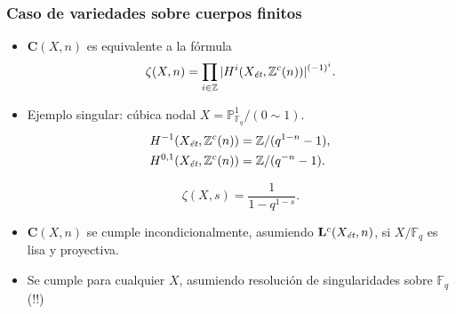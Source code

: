 \documentclass[handout]{beamer}
\newcommand{\FF}{\mathbb{F}}
\newcommand{\PP}{\mathbb{P}}
\newcommand{\ZZ}{\mathbb{Z}}
\newcommand{\et}{\text{\it ét}}
\begin{document}

\begin{frame}
  \frametitle{Caso de variedades sobre cuerpos finitos}

  \begin{itemize}
  \item<2-> $\mathbf{C} (X,n)$ es equivalente a la fórmula
    \[ \zeta (X,n) = \prod_{i \in \ZZ} |H^i (X_\et, \ZZ^c (n))|^{(-1)^i}. \]

  \item<3-> Ejemplo singular: cúbica nodal $X = \PP^1_{\FF_q} / (0\sim 1)$.
    \begin{align*}
      H^{-1} (X_\et, \ZZ^c (n)) & = \ZZ/(q^{1-n} - 1), \\
      H^{0,1} (X_\et, \ZZ^c (n)) & = \ZZ/(q^{-n} - 1).
    \end{align*}

    \[ \zeta (X,s) = \frac{1}{1 - q^{1-s}}. \]

  \item<4-> $\mathbf{C} (X,n)$ se cumple incondicionalmente, asumiendo
    $\mathbf{L}^c (X_\et, n)$, si $X/\FF_q$ es lisa y proyectiva.

  \item<5-> Se cumple para cualquier $X$, asumiendo resolución de
    singularidades sobre $\FF_q$ (!!)
  \end{itemize}
\end{frame}

\end{document}
